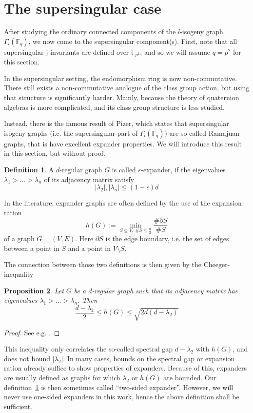 \documentclass{ociamthesis}
\newcommand{\F}{\mathbb{F}}
\newtheorem{prop}{Proposition}[section]
\theoremstyle{definition}
\newtheorem{definition}[prop]{Definition}
\begin{document}
\section{The supersingular case}
After studying the ordinary connected components of the $l$-isogeny graph $\Gamma_l(\F_q)$, we now come to the supersingular component(s).
First, note that all supersingular j-invariants are defined over $\F_{p^2}$, and so we will assume $q = p^2$ for this section.

In the supersingular setting, the endomorphism ring is now non-commutative.
There still exists a non-commutative analogue of the class group action, but using that structure is significantly harder.
Mainly, because the theory of quaternion algebras is more complicated, and its class group structure is less studied.

Instead, there is the famous result of Pizer, which states that supersingular isogeny graphs (i.e. the supersingular part of $\Gamma_l(\F_q)$) are so called Ramajuan graphs, that is have excellent expander properties.
We will introduce this result in this section, but without proof.
\begin{definition}
    \label{def:expander}
    A $d$-regular graph $G$ is called $\epsilon$-expander, if the eigenvalues $\lambda_1 > ... > \lambda_n$ of its adjacency matrix satisfy
    \begin{equation*}
        |\lambda_2|, |\lambda_n| \leq (1 - \epsilon) d
    \end{equation*}
\end{definition}
In the literature, expander graphs are often defined by the use of the expansion ration
\begin{equation*}
    h(G) := \min_{S \subseteq V, \ \#S \leq \frac n 2} \frac {\#\partial S} {\# S}
\end{equation*}
of a graph $G = (V, E)$.
Here $\partial S$ is the edge boundary, i.e. the set of edges between a point in $S$ and a point in $V \setminus S$.

The connection between those two definitions is then given by the Cheeger-inequality
\begin{prop}
    Let $G$ be a $d$-regular graph such that its adjacency matrix has eigenvalues $\lambda_1 > ... > \lambda_n$.
    Then
    \begin{equation*}
        \frac {d - \lambda_2} 2 \leq h(G) \leq \sqrt{2d(d - \lambda_2)}
    \end{equation*}
\end{prop}
\begin{proof}
    See e.g. \cite{cheeger_inequality}.
\end{proof}
This inequality only correlates the so-called spectral gap $d - \lambda_2$ with $h(G)$, and does not bound $|\lambda_2|$.
In many cases, bounds on the spectral gap or expansion ration already suffice to show properties of expanders.
Because of this, expanders are usually defined as graphs for which $\lambda_2$ or $h(G)$ are bounded.
Our definition~\ref{def:expander} is then sometimes called ``two-sided expander''.
However, we will never use one-sided expanders in this work, hence the above definition shall be sufficient.
\end{document}
